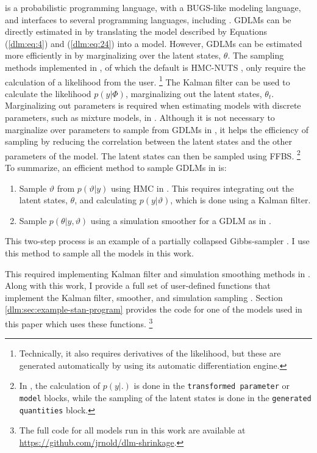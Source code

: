 \documentclass[12pt]{article}
\begin{document}
\Stan{} is a probabilistic programming language, with a BUGS-like modeling language, and interfaces to several programming languages, including \RLang{} \parencites{Stan2015a}{CarpenterGelmanHoffmanEtAl2015a}.
GDLMs can be directly estimated in \Stan{} by translating the model described by Equations (\ref{dlm:eq:4}) and (\ref{dlm:eq:24}) into a \Stan{} model.
However, GDLMs can be estimated more efficiently in \Stan{} by marginalizing over the latent states, $\theta$.
The sampling methods implemented in \Stan{}, of which the default is HMC-NUTS \parencites{HoffmanGelman2014a}, only require the calculation of a likelihood from the user.%
\footnote{Technically, it also requires derivatives of the likelihood, but these are generated automatically by \Stan{} using its automatic differentiation engine.}
The Kalman filter can be used to calculate the likelihood $p(y | \Phi)$, marginalizing out the latent states, $\theta_{t}$.
Marginalizing out parameters is required when estimating models with discrete parameters, such as mixture models, in \Stan{} \parencite[104]{Stan2015a}.
Although it is not necessary to marginalize over parameters to sample from GDLMs in \Stan{}, it helps the efficiency of sampling by reducing the correlation between the latent states and the other parameters of the model.%
The latent states can then be sampled using FFBS.
\footnote{In \Stan{}, the calculation of $p(y| .)$ is done in the \texttt{transformed parameter} or \texttt{model} blocks, while the sampling of the latent states is done in the \texttt{generated quantities} block.}
To summarize, an efficient method to sample GDLMs in \Stan{} is:
\begin{enumerate}
\item Sample $\vartheta$ from $p(\vartheta | y)$ using HMC in \Stan{}.
  This requires integrating out the latent states, $\theta$, and calculating $p(y | \vartheta)$, which is done using a Kalman filter.
\item Sample $p(\theta | y, \vartheta)$ using a simulation smoother for a GDLM as in  \parencites{CarterKohn1994}{Fruehwirth-Schnatter1994}{DeJongShephard1995}{DurbinKoopman2002}[Ch 4.9]{DurbinKoopman2012}.
\end{enumerate}
This two-step process is an example of a partially collapsed Gibbs-sampler \parencite{VanDykPark2008a}.
I use this method to sample all the models in this work.

This required implementing Kalman filter and simulation smoothing methods in \Stan{}.
Along with this work, I provide a full set of user-defined \Stan{} functions that implement the Kalman filter, smoother, and simulation sampling \textcite{Arnold2015c}.
Section \ref{dlm:sec:example-stan-program} provides the code for one of the \Stan{} models used in this paper which uses these functions.%
\footnote{The full code for all models run in this work are available at \url{https://github.com/jrnold/dlm-shrinkage}.}
\end{document}
